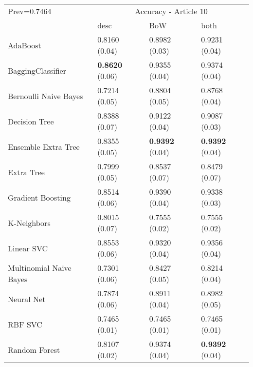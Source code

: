 \begin{tabular}{|l|l|l|l| }
\hline
Prev=0.7464 &  \multicolumn{3}{c|}{Accuracy - Article 10} \\
\cline{2-4} & desc & BoW & both \\ \hline
AdaBoost                & 0.8160 (0.04) & 0.8982 (0.03) & 0.9231 (0.04)\\
BaggingClassifier       & {\bf 0.8620} (0.06) & 0.9355 (0.04) & 0.9374 (0.04)\\
Bernoulli Naive Bayes   & 0.7214 (0.05) & 0.8804 (0.05) & 0.8768 (0.04)\\
Decision Tree           & 0.8388 (0.07) & 0.9122 (0.04) & 0.9087 (0.03)\\
Ensemble Extra Tree     & 0.8355 (0.05) & {\bf 0.9392} (0.04) & {\bf 0.9392} (0.04)\\
Extra Tree              & 0.7999 (0.05) & 0.8537 (0.07) & 0.8479 (0.07)\\
Gradient Boosting       & 0.8514 (0.06) & 0.9390 (0.04) & 0.9338 (0.03)\\
K-Neighbors             & 0.8015 (0.07) & 0.7555 (0.02) & 0.7555 (0.02)\\
Linear SVC              & 0.8553 (0.06) & 0.9320 (0.04) & 0.9356 (0.04)\\
Multinomial Naive Bayes & 0.7301 (0.06) & 0.8427 (0.05) & 0.8214 (0.04)\\
Neural Net              & 0.7874 (0.06) & 0.8911 (0.04) & 0.8982 (0.05)\\
RBF SVC                 & 0.7465 (0.01) & 0.7465 (0.01) & 0.7465 (0.01)\\
Random Forest           & 0.8107 (0.02) & 0.9374 (0.04) & {\bf 0.9392} (0.04)\\
\hline
\end{tabular}